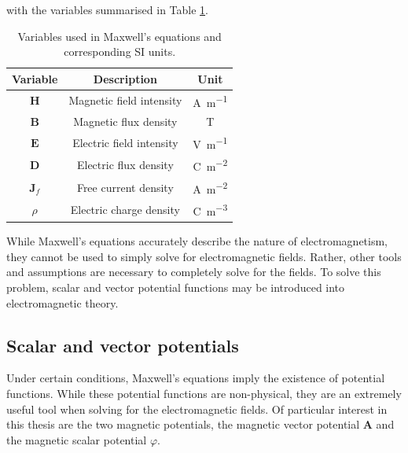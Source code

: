 \noindent with the variables summarised in Table \ref{tab:maxwellEquationVars}.
\begin{table}
    \centering
    \caption{Variables used in Maxwell's equations and corresponding SI units.}
    \label{tab:maxwellEquationVars}
    \begin{tabular}{c|c|c}
         Variable & Description & Unit \\ \hline
         \(\mathbf{H}\) & Magnetic field intensity & \si{\ampere\per\metre} \\
         \(\mathbf{B}\) & Magnetic flux density & \si{\tesla} \\
         \(\mathbf{E}\) & Electric field intensity & \si{\volt\per\metre} \\
         \(\mathbf{D}\) & Electric flux density & \si{\coulomb\per\metre\squared} \\
         \(\mathbf{J}_f\) & Free current density & \si{\ampere\per\metre\squared} \\
         \(\rho\) & Electric charge density & \si{\coulomb\per\metre\cubed}
    \end{tabular}
\end{table}

While Maxwell's equations accurately describe the nature of electromagnetism, they cannot be used to simply solve for electromagnetic fields. Rather, other tools and assumptions are necessary to completely solve for the fields. To solve this problem, scalar and vector potential functions may be introduced into electromagnetic theory.

\subsection{Scalar and vector potentials}
Under certain conditions, Maxwell's equations imply the existence of potential functions. While these potential functions are non-physical, they are an extremely useful tool when solving for the electromagnetic fields. Of particular interest in this thesis are the two magnetic potentials, the magnetic vector potential \(\mathbf{A}\) and the magnetic scalar potential \(\varphi\).

